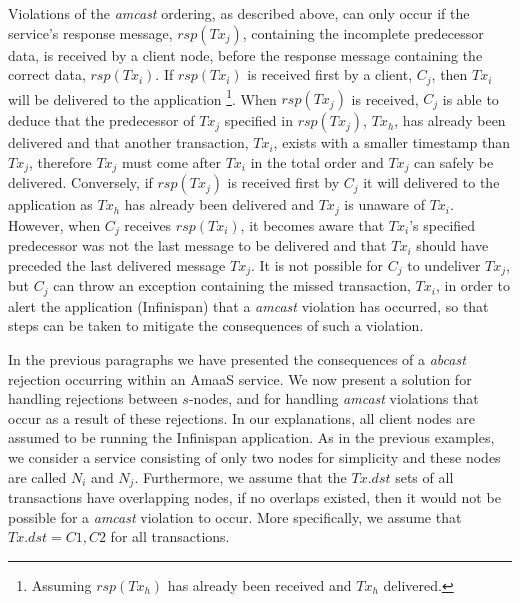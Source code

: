 Violations of the \emph{amcast} ordering, as described above, can only occur if the service's response message, $rsp(Tx_j)$, containing the incomplete predecessor data, is received by a client node, before the response message containing the correct data, $rsp(Tx_i)$.  If $rsp(Tx_i)$ is received first by a client, $C_j$, then $Tx_i$ will be delivered to the application \footnote{Assuming $rsp(Tx_h)$ has already been received and $Tx_h$ delivered.}.  When $rsp(Tx_j)$ is received, $C_j$ is able to deduce that the predecessor of $Tx_j$ specified in $rsp(Tx_j)$, $Tx_h$, has already been delivered and that another transaction, $Tx_i$, exists with a smaller timestamp than $Tx_j$, therefore $Tx_j$ must come after $Tx_i$ in the total order and $Tx_j$ can safely be delivered. Conversely, if $rsp(Tx_j)$ is received first by $C_j$ it will delivered to the application as $Tx_h$ has already been delivered and $Tx_j$ is unaware of $Tx_i$.  However, when $C_j$ receives $rsp(Tx_i)$, it becomes aware that $Tx_i$'s specified predecessor was not the last message to be delivered and that $Tx_i$ should have preceded the last delivered message $Tx_j$.  It is not possible for $C_j$ to undeliver $Tx_j$, but $C_j$ can throw an exception containing the missed transaction, $Tx_i$, in order to alert the application (Infinispan) that a \emph{amcast} violation has occurred, so that steps can be taken to mitigate the consequences of such a violation.  

In the previous paragraphs we have presented the consequences of a \emph{abcast} rejection occurring within an \textsf{AmaaS} service.  We now present a solution for handling rejections between $s$-nodes, and for handling \emph{amcast} violations that occur as a result of these rejections.  In our explanations, all client nodes are assumed to be running the Infinispan application.  As in the previous examples, we consider a service consisting of only two nodes for simplicity and these nodes are called $N_i$ and $N_j$.  Furthermore, we assume that the $Tx.dst$ sets of all transactions have overlapping nodes, if no overlaps existed, then it would not be possible for a \emph{amcast} violation to occur.  More specifically, we assume that $Tx.dst = {C1,C2}$ for all transactions.  

